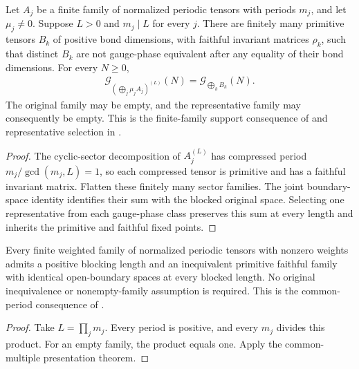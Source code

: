 \begin{lemma}
    \label{thm:periodic_block_family_primitive_presentation}
    \leanok
    Let $A_j$ be a finite family of normalized periodic tensors with periods
    $m_j$, and let $\mu_j\neq0$. Suppose $L>0$ and $m_j\mid L$ for every $j$.
    There are finitely many primitive tensors $B_k$ of positive bond
    dimensions, with faithful invariant matrices $\rho_k$, such that
    distinct $B_k$ are not gauge-phase equivalent after any equality of
    their bond dimensions. For every $N\geq0$,
    \begin{align}
        \mathcal G_{(\bigoplus_j\mu_jA_j)^{(L)}}(N)
        =\mathcal G_{\bigoplus_k B_k}(N).
    \end{align}
    The original family may be empty, and the representative family may
    consequently be empty. This is the finite-family support consequence
    of \cite[Lemma~6]{DeLasCuevas2017Irreducible}
    and representative selection in
    \cite[Proposition~2.7]{Cirac2016MPDO_arXiv}.
\end{lemma}
\begin{proof}\leanok
    The cyclic-sector decomposition of $A_j^{(L)}$ has compressed period
    $m_j/\gcd(m_j,L)=1$, so each compressed tensor is primitive and has a
    faithful invariant matrix. Flatten these finitely many sector families.
    The joint boundary-space identity identifies their sum with the
    blocked original space. Selecting one representative from each
    gauge-phase class preserves this sum at every length and inherits
    the primitive and faithful fixed points.
\end{proof}

\begin{lemma}
    \label{thm:periodic_block_family_primitive_presentation_exists}
    \leanok
    Every finite weighted family of normalized periodic tensors with
    nonzero weights admits a positive blocking length and an inequivalent
    primitive faithful family with identical open-boundary spaces at
    every blocked length. No original inequivalence or nonempty-family
    assumption is required. This is the common-period consequence of
    \cite[Lemma~6]{DeLasCuevas2017Irreducible}.
\end{lemma}
\begin{proof}\leanok
    Take $L=\prod_jm_j$. Every period is positive, and every $m_j$ divides
    this product. For an empty family, the product equals one. Apply the
    common-multiple presentation theorem.
\end{proof}

